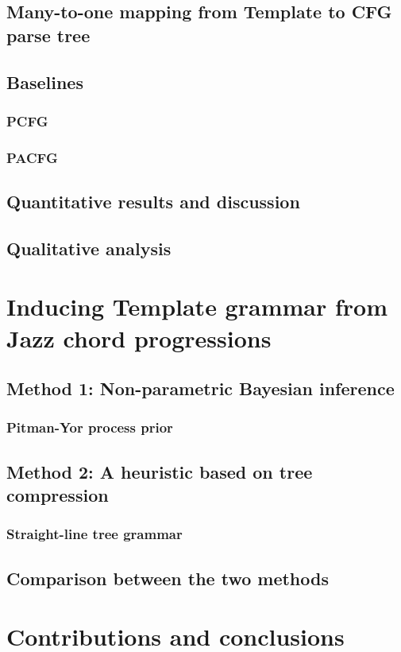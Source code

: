    \section{Many-to-one mapping from Template to CFG parse tree}
    \section{Baselines}
        \subsection{PCFG}
        \subsection{PACFG}
    \section{Quantitative results and discussion}
    \section{Qualitative analysis}
\chapter{Inducing Template grammar from Jazz chord progressions}
    \section{Method 1: Non-parametric Bayesian inference}
        \subsection{Pitman-Yor process prior}
    \section{Method 2: A heuristic based on tree compression} 
        \subsection{Straight-line tree grammar}
    \section{Comparison between the two methods}
   
\chapter{Contributions and conclusions}

